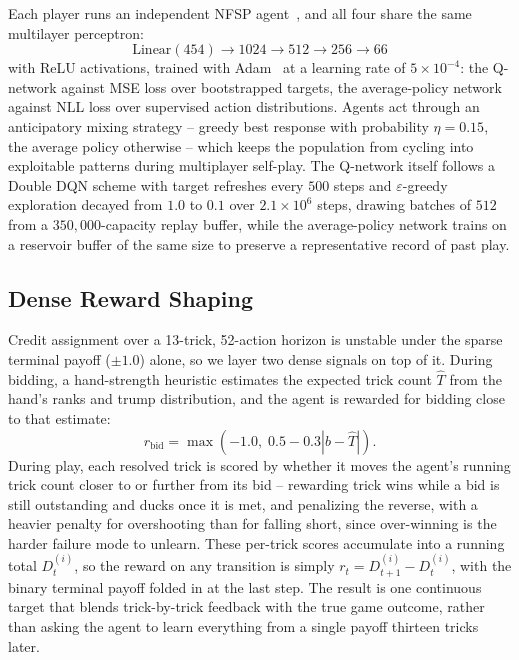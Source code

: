 \documentclass[conference]{IEEEtran}
\begin{document}
Each player runs an independent NFSP agent~\cite{silver2016deep}, and all four share the same multilayer perceptron:
\begin{equation}
    \text{Linear}(454) \rightarrow 1024 \rightarrow 512 \rightarrow 256 \rightarrow 66
    \label{eq:network}
\end{equation}
with ReLU activations, trained with Adam~\cite{kingma2015adam} at a learning rate of $5\times10^{-4}$: the Q-network against MSE loss over bootstrapped targets, the average-policy network against NLL loss over supervised action distributions. Agents act through an anticipatory mixing strategy -- greedy best response with probability $\eta=0.15$, the average policy otherwise -- which keeps the population from cycling into exploitable patterns during multiplayer self-play. The Q-network itself follows a Double DQN scheme with target refreshes every $500$ steps and $\varepsilon$-greedy exploration decayed from $1.0$ to $0.1$ over $2.1\times10^6$ steps, drawing batches of $512$ from a $350{,}000$-capacity replay buffer, while the average-policy network trains on a reservoir buffer of the same size to preserve a representative record of past play.
 
\subsection{\textbf{Dense Reward Shaping}}
\label{sec:dense}
 
Credit assignment over a 13-trick, 52-action horizon is unstable under the sparse terminal payoff ($\pm1.0$) alone, so we layer two dense signals on top of it. During bidding, a hand-strength heuristic estimates the expected trick count $\hat{T}$ from the hand's ranks and trump distribution, and the agent is rewarded for bidding close to that estimate:
\begin{equation}
    r_{\text{bid}} = \max\!\left(-1.0,\;0.5-0.3|b-\hat{T}|\right).
    \label{eq:bid_reward}
\end{equation}
During play, each resolved trick is scored by whether it moves the agent's running trick count closer to or further from its bid -- rewarding trick wins while a bid is still outstanding and ducks once it is met, and penalizing the reverse, with a heavier penalty for overshooting than for falling short, since over-winning is the harder failure mode to unlearn. These per-trick scores accumulate into a running total $D_t^{(i)}$, so the reward on any transition is simply $r_t = D_{t+1}^{(i)} - D_t^{(i)}$, with the binary terminal payoff folded in at the last step. The result is one continuous target that blends trick-by-trick feedback with the true game outcome, rather than asking the agent to learn everything from a single payoff thirteen tricks later.
 
\end{document}
